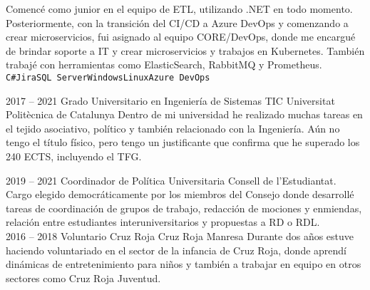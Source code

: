\documentclass[9pt]{developercv} %
\begin{document}
\begin{entrylist}
{		Comencé como junior en el equipo de ETL, utilizando .NET en todo momento. Posteriormente, con la transición del CI/CD a Azure DevOps y comenzando a crear microservicios, fui asignado al equipo CORE/DevOps, donde me encargué de brindar soporte a IT y crear microservicios y trabajos en Kubernetes. También trabajé con herramientas como ElasticSearch, RabbitMQ y Prometheus.
		\\ \texttt{C\#}\slashsep\texttt{Jira}\slashsep\texttt{SQL Server}\slashsep\texttt{Windows}\slashsep\texttt{Linux}\slashsep\texttt{Azure DevOps}}
\end{entrylist}

\clearpage



\begin{entrylist}
	\entry
		{2017 -- 2021}
		{Grado Universitario en Ingeniería de Sistemas TIC}
		{Universitat Politècnica de Catalunya}
		{Dentro de mi universidad he realizado muchas tareas en el tejido asociativo, político y también relacionado con la Ingeniería. Aún no tengo el título físico, pero tengo un justificante que confirma que he superado los 240 ECTS, incluyendo el TFG.}
\end{entrylist}


\begin{entrylist}
	\entry
	{2019 -- 2021}
	{Coordinador de Política Universitaria}
	{Consell de l'Estudiantat.}
	{Cargo elegido democráticamente por los miembros del Consejo donde desarrollé tareas de coordinación de grupos de trabajo, redacción de mociones y enmiendas, relación entre estudiantes interuniversitarios y propuestas a RD o RDL. \\ }
	\entry
	{2016 -- 2018}
	{Voluntario Cruz Roja}
	{Cruz Roja Manresa}
	{Durante dos años estuve haciendo voluntariado en el sector de la infancia de Cruz Roja, donde aprendí dinámicas de entretenimiento para niños y también a trabajar en equipo en otros sectores como Cruz Roja Juventud. \\ }
\end{entrylist}

\end{document}
